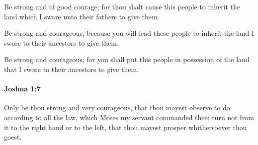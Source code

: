 			\begin{versebox}
					\item[BHS] 
					\item[ASV] Be strong and of good courage; for thou shalt cause this people to inherit the land which I sware unto their fathers to give them.
					\item[NIV] Be strong and courageous, because you will lead these people to inherit the land I swore to their ancestors to give them.
					\item[NRSV] Be strong and courageous; for you shall put this people in possession of the land that I swore to their ancestors to give them.
			\end{versebox}

		\paragraph{Joshua 1:7} %
			\label{JOSHUA-1-7}

			Only be thou strong and very courageous, that thou mayest observe to do according to all the law, which Moses my servant commanded thee: turn not from it to the right hand or to the left, that thou mayest prosper whithersoever thou goest.

